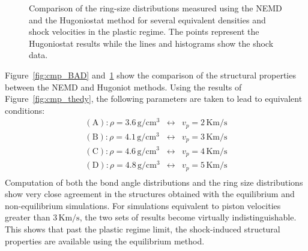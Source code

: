 \documentclass[aps,10pt,twocolumn]{revtex4}
\newcommand{\mrm}[1]{\ensuremath{\mathrm{#1}}\xspace}
\newlength{\picW}	%
\newcommand{\picA}{270}	%
\newcommand{\picL}[1]{\texttt{[image: \#1]}}
\begin{document}
\picW=4cm
\begin{figure}
\subfigure[equivalence (A)]{\picL{fig10a}}
\subfigure[equivalence (B)]{\picL{fig10b}}

\subfigure[equivalence (C)]{\picL{fig10c}}
\subfigure[equivalence (D)]{\picL{fig10d}}
\caption{Comparison of the ring-size distributions measured using the NEMD and the Hugoniostat method
for several equivalent densities and shock velocities in the plastic regime. The points
represent the Hugoniostat results while the lines and histograms show the shock data.}
\label{fig:cmp_ring}
\end{figure}




Figure~\ref{fig:cmp_BAD} and~\ref{fig:cmp_ring}  show the comparison of the structural properties between the NEMD
and Hugoniot methods. Using the results of Figure~\ref{fig:cmp_thedy}, the following parameters
are taken to lead to equivalent conditions:
\begin{eqnarray*} 
\mrm{(A):}\rho=3.6\, \mrm{ g/cm^{3}} &\leftrightarrow& v_p=2\, \mrm{ Km/s}\\
\mrm{(B):}\rho=4.1\, \mrm{ g/cm^{3}} &\leftrightarrow& v_p=3\, \mrm{ Km/s}\\
\mrm{(C):}\rho=4.6\, \mrm{ g/cm^{3}} &\leftrightarrow& v_p=4\, \mrm{ Km/s}\\
\mrm{(D):}\rho=4.8\, \mrm{ g/cm^{3}} &\leftrightarrow& v_p=5\, \mrm{ Km/s}\\
\end{eqnarray*}
Computation of both the bond angle distributions and the ring size distributions show very
close agreement in the structures obtained with the equilibrium and non-equilibrium
simulations. For simulations equivalent to piston velocities greater than $3\,\mrm{ Km/s}$,
the two sets of results become virtually indistinguishable. This shows that past the plastic
regime limit, the shock-induced structural properties are available using the equilibrium
method.\\
\end{document}
